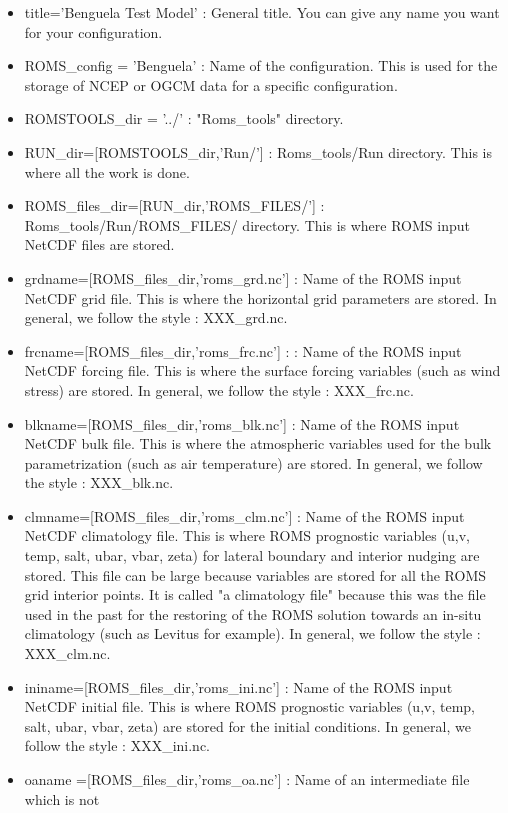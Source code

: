 \begin{itemize}
\item title='Benguela Test Model' : General title. You can give any name 
you want for your configuration.
\item ROMS\_config = 'Benguela' : Name of the configuration. This is used for the storage of
NCEP or OGCM data for a specific configuration.
\item ROMSTOOLS\_dir = '../' : "Roms\_tools" directory.
\item RUN\_dir=[ROMSTOOLS\_dir,'Run/'] : Roms\_tools/Run directory. This is where all 
the work is done.
\item ROMS\_files\_dir=[RUN\_dir,'ROMS\_FILES/'] : Roms\_tools/Run/ROMS\_FILES/ directory.
This is where ROMS input NetCDF files are stored.
%
\item grdname=[ROMS\_files\_dir,'roms\_grd.nc'] : Name of the ROMS input NetCDF grid file.
This is where the horizontal grid parameters are stored. In general, we follow 
the style : XXX\_grd.nc.
\item frcname=[ROMS\_files\_dir,'roms\_frc.nc'] : : Name of the ROMS input NetCDF forcing file.
This is where the surface forcing variables (such as wind stress) are stored. In general, we 
follow  the style : XXX\_frc.nc.
\item blkname=[ROMS\_files\_dir,'roms\_blk.nc'] : Name of the ROMS input NetCDF bulk file.
This is where the atmospheric variables used for the bulk parametrization (such as air temperature) 
are stored. In general, we follow  the style : XXX\_blk.nc.
\item clmname=[ROMS\_files\_dir,'roms\_clm.nc'] : Name of the ROMS input NetCDF climatology file.
This is where ROMS prognostic variables (u,v, temp, salt, ubar, vbar, zeta) for lateral boundary 
and interior nudging are stored. This file can be large because variables are stored for all the 
ROMS grid interior points. It is called "a climatology file" because this was the file used in 
the past for the restoring of the ROMS solution towards an in-situ climatology (such as Levitus 
for example). In general, we follow the style : XXX\_clm.nc.
\item ininame=[ROMS\_files\_dir,'roms\_ini.nc'] : Name of the ROMS input NetCDF initial file.
This is where ROMS prognostic variables (u,v, temp, salt, ubar, vbar, zeta) are stored 
for the initial conditions. In general, we follow the style : XXX\_ini.nc.
\item oaname =[ROMS\_files\_dir,'roms\_oa.nc'] : Name of an intermediate file which is not

\end{itemize}
